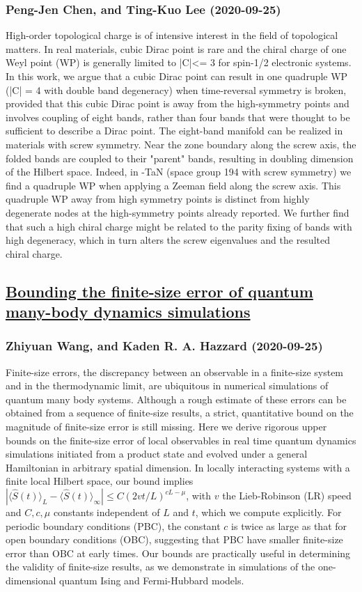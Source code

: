 \subsubsection*{Peng-Jen Chen, and Ting-Kuo Lee (2020-09-25)}
High-order topological charge is of intensive interest in the field of
topological matters. In real materials, cubic Dirac point is rare and the
chiral charge of one Weyl point (WP) is generally limited to |C|<= 3 for
spin-1/2 electronic systems. In this work, we argue that a cubic Dirac point
can result in one quadruple WP (|C| = 4 with double band degeneracy) when
time-reversal symmetry is broken, provided that this cubic Dirac point is away
from the high-symmetry points and involves coupling of eight bands, rather than
four bands that were thought to be sufficient to describe a Dirac point. The
eight-band manifold can be realized in materials with screw symmetry. Near the
zone boundary along the screw axis, the folded bands are coupled to their
"parent" bands, resulting in doubling dimension of the Hilbert space. Indeed,
in \epsilon-TaN (space group 194 with screw symmetry) we find a quadruple WP
when applying a Zeeman field along the screw axis. This quadruple WP away from
high symmetry points is distinct from highly degenerate nodes at the
high-symmetry points already reported. We further find that such a high chiral
charge might be related to the parity fixing of bands with high degeneracy,
which in turn alters the screw eigenvalues and the resulted chiral charge.

\subsection*{\href{http://arxiv.org/abs/2009.12032v1}{Bounding the finite-size error of quantum many-body dynamics simulations}}
\subsubsection*{Zhiyuan Wang, and Kaden R. A. Hazzard (2020-09-25)}
Finite-size errors, the discrepancy between an observable in a finite-size
system and in the thermodynamic limit, are ubiquitous in numerical simulations
of quantum many body systems. Although a rough estimate of these errors can be
obtained from a sequence of finite-size results, a strict, quantitative bound
on the magnitude of finite-size error is still missing. Here we derive rigorous
upper bounds on the finite-size error of local observables in real time quantum
dynamics simulations initiated from a product state and evolved under a general
Hamiltonian in arbitrary spatial dimension. In locally interacting systems with
a finite local Hilbert space, our bound implies $ |\langle
\hat{S}(t)\rangle_L-\langle \hat{S}(t)\rangle_\infty|\leq C(2v t/L)^{cL-\mu}$,
with $v$ the Lieb-Robinson (LR) speed and $C, c,\mu $ constants independent of
$L$ and $t$, which we compute explicitly. For periodic boundary conditions
(PBC), the constant $c$ is twice as large as that for open boundary conditions
(OBC), suggesting that PBC have smaller finite-size error than OBC at early
times. Our bounds are practically useful in determining the validity of
finite-size results, as we demonstrate in simulations of the one-dimensional
quantum Ising and Fermi-Hubbard models.

